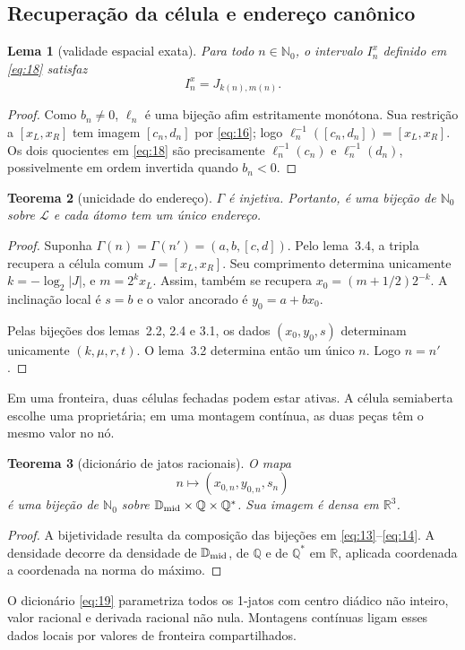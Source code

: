 \documentclass[11pt,a4paper]{article}
\theoremstyle{preciso}
\newtheorem{teorema}{Teorema}[section]
\newtheorem{lema}[teorema]{Lema}
\theoremstyle{definition}
\newcommand{\N}{\mathbb N}
\newcommand{\Q}{\mathbb Q}
\newcommand{\R}{\mathbb R}
\newcommand{\D}{\mathbb D}
\newcommand{\LL}{\mathcal L}
\newcommand{\eqn}[2]{\begin{equation}\label{eq:#1}#2\end{equation}}
\begin{document}
\subsection{Recuperação da célula e endereço canônico}
\begin{lema}[validade espacial exata]
Para todo $n\in\N_0$, o intervalo $I_n^x$ definido em \eqref{eq:18} satisfaz
\[
I_n^x=J_{k(n),m(n)}.
\]
\end{lema}
\begin{proof}
Como $b_n\ne0$, $\ell_n$ é uma bijeção afim estritamente monótona. Sua restrição a $[x_L,x_R]$ tem imagem $[c_n,d_n]$ por \eqref{eq:16}; logo $\ell_n^{-1}([c_n,d_n])=[x_L,x_R]$. Os dois quocientes em \eqref{eq:18} são precisamente $\ell_n^{-1}(c_n)$ e $\ell_n^{-1}(d_n)$, possivelmente em ordem invertida quando $b_n<0$.
\end{proof}
\begin{teorema}[unicidade do endereço]
$\Gamma$ é injetiva. Portanto, é uma bijeção de $\N_0$ sobre $\LL$ e cada átomo tem um único endereço.
\end{teorema}
\begin{proof}
Suponha $\Gamma(n)=\Gamma(n')=(a,b,[c,d])$. Pelo lema~3.4, a tripla recupera a célula comum $J=[x_L,x_R]$. Seu comprimento determina unicamente $k=-\log_2|J|$, e $m=2^kx_L$. Assim, também se recupera $x_0=(m+1/2)2^{-k}$. A inclinação local é $s=b$ e o valor ancorado é $y_0=a+bx_0$.

Pelas bijeções dos lemas~2.2, 2.4 e 3.1, os dados $(x_0,y_0,s)$ determinam unicamente $(k,\mu,r,t)$. O lema~3.2 determina então um único $n$. Logo $n=n'$.
\end{proof}
Em uma fronteira, duas células fechadas podem estar ativas. A célula semiaberta escolhe uma proprietária; em uma montagem contínua, as duas peças têm o mesmo valor no nó.
\begin{teorema}[dicionário de jatos racionais]
O mapa
\eqn{19}{n\longmapsto(x_{0,n},y_{0,n},s_n)}
é uma bijeção de $\N_0$ sobre $\D_{\rm mid}\times\Q\times\Q^*$. Sua imagem é densa em $\R^3$.
\end{teorema}
\begin{proof}
A bijetividade resulta da composição das bijeções em \eqref{eq:13}--\eqref{eq:14}. A densidade decorre da densidade de $\D_{\rm mid}$, de $\Q$ e de $\Q^*$ em $\R$, aplicada coordenada a coordenada na norma do máximo.
\end{proof}
O dicionário \eqref{eq:19} parametriza todos os 1-jatos com centro diádico não inteiro, valor racional e derivada racional não nula. Montagens contínuas ligam esses dados locais por valores de fronteira compartilhados.
\end{document}
